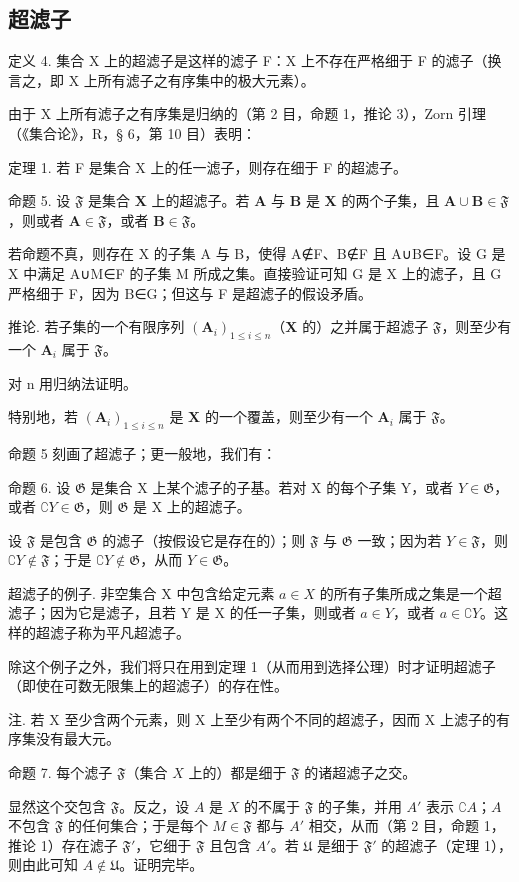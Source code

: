 \subsection{超滤子}

定义 4. 集合 X 上的超滤子是这样的滤子 F：X 上不存在严格细于 F 的滤子（换言之，即 X 上所有滤子之有序集中的极大元素）。

由于 X 上所有滤子之有序集是归纳的（第 2 目，命题 1，推论 3），Zorn 引理（《集合论》，R，§ 6，第 10 目）表明：

定理 1. 若 F 是集合 X 上的任一滤子，则存在细于 F 的超滤子。

命题 5. 设 \(\mathfrak{F}\) 是集合 \(\mathbf{X}\) 上的超滤子。若 \(\mathbf{A}\) 与 \(\mathbf{B}\) 是 \(\mathbf{X}\) 的两个子集，且 \(\mathbf{A} \cup \mathbf{B} \in \mathfrak{F}\)，则或者 \(\mathbf{A} \in \mathfrak{F}\)，或者 \(\mathbf{B} \in \mathfrak{F}\)。

若命题不真，则存在 X 的子集 A 与 B，使得 A∉F、B∉F 且 A∪B∈F。设 G 是 X 中满足 A∪M∈F 的子集 M 所成之集。直接验证可知 G 是 X 上的滤子，且 G 严格细于 F，因为 B∈G；但这与 F 是超滤子的假设矛盾。

推论. 若子集的一个有限序列 \((\mathbf{A}_i)_{1 \leqslant i \leqslant n}\)（\(\mathbf{X}\) 的）之并属于超滤子 \(\mathfrak{F}\)，则至少有一个 \(\mathbf{A}_i\) 属于 \(\mathfrak{F}\)。

对 n 用归纳法证明。

特别地，若 \((\mathbf{A}_i)_{1\leqslant i\leqslant n}\) 是 \(\mathbf{X}\) 的一个覆盖，则至少有一个 \(\mathbf{A}_i\) 属于 \(\mathfrak{F}\)。

命题 5 刻画了超滤子；更一般地，我们有：

命题 6. 设 \(\mathfrak{G}\) 是集合 X 上某个滤子的子基。若对 X 的每个子集 Y，或者 \(Y \in \mathfrak{G}\)，或者 \(\complement Y \in \mathfrak{G}\)，则 \(\mathfrak{G}\) 是 X 上的超滤子。

设 \(\mathfrak{F}\) 是包含 \(\mathfrak{G}\) 的滤子（按假设它是存在的）；则 \(\mathfrak{F}\) 与 \(\mathfrak{G}\) 一致；因为若 \(Y \in \mathfrak{F}\)，则 \(\complement Y \notin \mathfrak{F}\)；于是 \(\complement Y \notin \mathfrak{G}\)，从而 \(Y \in \mathfrak{G}\)。

超滤子的例子. 非空集合 X 中包含给定元素 \(a \in X\) 的所有子集所成之集是一个超滤子；因为它是滤子，且若 Y 是 X 的任一子集，则或者 \(a \in Y\)，或者 \(a \in \complement Y\)。这样的超滤子称为平凡超滤子。

除这个例子之外，我们将只在用到定理 1（从而用到选择公理）时才证明超滤子（即使在可数无限集上的超滤子）的存在性。

注. 若 X 至少含两个元素，则 X 上至少有两个不同的超滤子，因而 X 上滤子的有序集没有最大元。

命题 7. 每个滤子 \(\mathfrak{F}\)（集合 \(X\) 上的）都是细于 \(\mathfrak{F}\) 的诸超滤子之交。

显然这个交包含 \(\mathfrak{F}\)。反之，设 \(A\) 是 \(X\) 的不属于 \(\mathfrak{F}\) 的子集，并用 \(A'\) 表示 \(\complement A\)；\(A\) 不包含 \(\mathfrak{F}\) 的任何集合；于是每个 \(M \in \mathfrak{F}\) 都与 \(A'\) 相交，从而（第 2 目，命题 1，推论 1）存在滤子 \(\mathfrak{F}'\)，它细于 \(\mathfrak{F}\) 且包含 \(A'\)。若 \(\mathfrak{U}\) 是细于 \(\mathfrak{F}'\) 的超滤子（定理 1），则由此可知 \(A \notin \mathfrak{U}\)。证明完毕。

